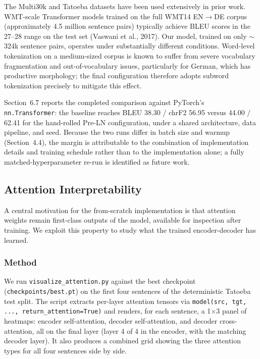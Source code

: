 The Multi30k and Tatoeba datasets have been used extensively in prior work. WMT-scale Transformer models trained on the full WMT14 EN$\rightarrow$DE corpus (approximately 4.5 million sentence pairs) typically achieve BLEU scores in the 27--28 range on the test set (Vaswani et al., 2017). Our model, trained on only $\sim$324k sentence pairs, operates under substantially different conditions. Word-level tokenization on a medium-sized corpus is known to suffer from severe vocabulary fragmentation and out-of-vocabulary issues, particularly for German, which has productive morphology; the final configuration therefore adopts subword tokenization precisely to mitigate this effect.

Section~6.7 reports the completed comparison against PyTorch's \texttt{nn.Transformer}: the baseline reaches BLEU 38.30 / chrF2 56.95 versus 44.00 / 62.41 for the hand-rolled Pre-LN configuration, under a shared architecture, data pipeline, and seed. Because the two runs differ in batch size and warmup (Section~4.4), the margin is attributable to the combination of implementation details and training schedule rather than to the implementation alone; a fully matched-hyperparameter re-run is identified as future work.

\subsection{Attention Interpretability}

A central motivation for the from-scratch implementation is that attention weights remain first-class outputs of the model, available for inspection after training. We exploit this property to study what the trained encoder-decoder has learned.

\subsubsection{Method}

We run \texttt{visualize\_attention.py} against the best checkpoint (\texttt{checkpoints/best.pt}) on the first four sentences of the deterministic Tatoeba test split. The script extracts per-layer attention tensors via \texttt{model(src, tgt, ..., return\_attention=True)} and renders, for each sentence, a 1$\times$3 panel of heatmaps: encoder self-attention, decoder self-attention, and decoder cross-attention, all on the final layer (layer 4 of 4 in the encoder, with the matching decoder layer). It also produces a combined grid showing the three attention types for all four sentences side by side.

